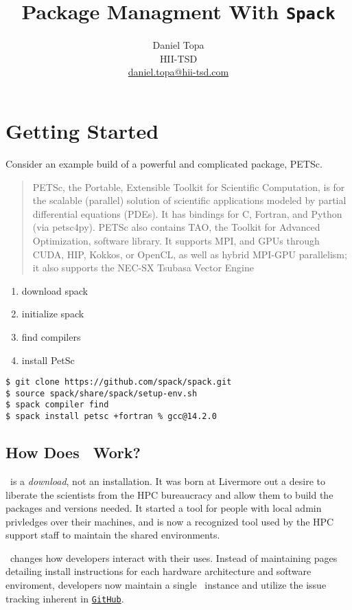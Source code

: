 \documentclass[10pt, oneside]{article}   	%
\title{Package Managment With \texttt{Spack}}
\author{Daniel Topa\\HII-TSD\\\href{mailto:daniel.topa@hii-tsd.com}{daniel.topa@hii-tsd.com}}
\begin{document}
\maketitle
{}

\section{Getting Started}
Consider an example build of a powerful and complicated package, PETSc.

\begin{quote}
PETSc, the Portable, Extensible Toolkit for Scientific Computation,  is for the scalable (parallel) solution of scientific applications modeled by partial differential equations (PDEs). It has bindings for C, Fortran, and Python (via petsc4py). PETSc also contains TAO, the Toolkit for Advanced Optimization, software library. It supports MPI, and GPUs through CUDA, HIP, Kokkos, or OpenCL, as well as hybrid MPI-GPU parallelism; it also supports the NEC-SX Tsubasa Vector Engine
\end{quote}

\begin{enumerate}
	\item download spack
	\item initialize spack
	\item find compilers
	\item install PetSc
\end{enumerate}

\begin{verbatim}
$ git clone https://github.com/spack/spack.git
$ source spack/share/spack/setup-env.sh
$ spack compiler find
$ spack install petsc +fortran % gcc@14.2.0
\end{verbatim}

\subsection{How Does \spack \ Work?}
\spack \ is a \emph{download}, not an {installation}. It was born at Livermore out a desire to liberate the scientists from the HPC bureaucracy and allow them to build the packages and versions needed. It started a tool for people with local admin privledges over their machines, and is now a recognized tool used by the HPC support staff to maintain the shared environments.

\spack \ changes how developers interact with their uses. Instead of maintaining pages detailing install instructions for each hardware architecture and software enviroment, developers now maintain a single \spack \ instance and utilize the issue tracking inherent in \href{https://github.com/spack/spack}{\texttt{GitHub}}.
\end{document}
